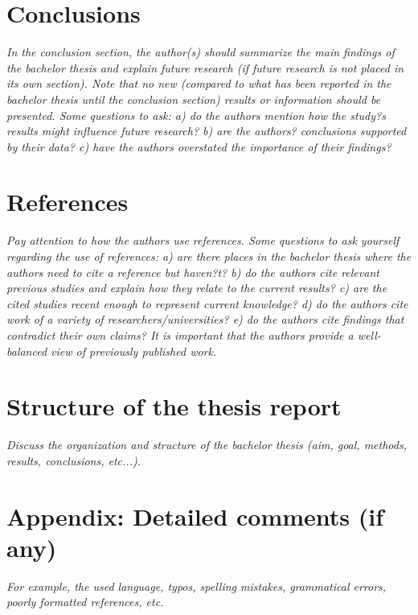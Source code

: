 \documentclass[conference]{IEEEtran}
\begin{document}
\section{Conclusions}
\textit{In the conclusion section, the author(s) should summarize the main findings of the bachelor thesis and explain future research (if future research is not placed in its own section). Note that no new (compared to what has been reported in the bachelor thesis until the conclusion section) results or information should be presented. Some questions to ask: a) do the authors mention how the study?s results might influence future research? b) are the authors? conclusions supported by their data? c) have the authors overstated the importance of their findings?}


\section{References}
\textit{Pay attention to how the authors use references. Some questions to ask yourself regarding the use of references: a) are there places in the bachelor thesis where the authors need to cite a reference but haven?t? b) do the authors cite relevant previous studies and explain how they relate to the current results? c) are the cited studies recent enough to represent current knowledge? d) do the authors cite work of a variety of researchers/universities? e) do the authors cite findings that contradict their own claims? It is important that the authors provide a well-balanced view of previously published work.}


\section{Structure of the thesis report}
\textit{Discuss the organization and structure of the bachelor thesis (aim, goal, methods, results, conclusions, etc...).}



\section*{Appendix: Detailed comments (if any)}
\textit{For example, the used language, typos, spelling mistakes, grammatical errors, poorly formatted references, etc. }

\vspace{12pt}
\end{document}
